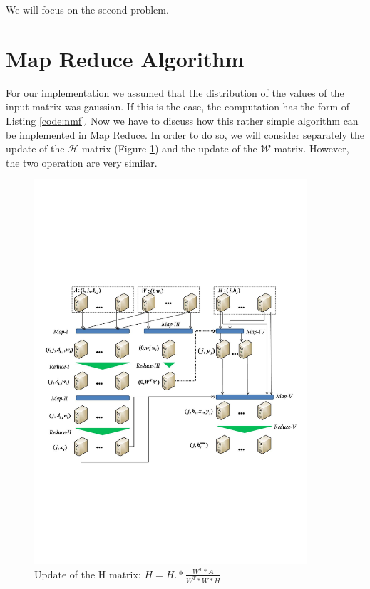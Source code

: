 \documentclass[a4paper,12pt]{article}
\begin{document}
We will focus on the second problem.

\section{Map Reduce Algorithm }
\label{mapreduce}

For our implementation we assumed that the distribution of the values of the input matrix was gaussian.
If this is the case, the computation has the form of Listing \ref{code:nmf}.
Now we have to discuss how this rather simple algorithm can be implemented in Map Reduce\cite{liu2010}.
In order to do so, we will consider separately the update of the $\mathcal{H}$ matrix (Figure \ref{fig:mapReduceScheme}) and the update of the $\mathcal{W}$ matrix.
However, the two operation are very similar.

\begin{center}
	\begin{figure}[h]
	\centering
	\includegraphics[width=0.9\textwidth]{./figures/mapReduceScheme}
	\caption{Update of the H matrix: $H = H.*\frac{W^T*A}{W^T*W*H}$ }
	\label{fig:mapReduceScheme}
	\end{figure}
\end{center}
\end{document}
